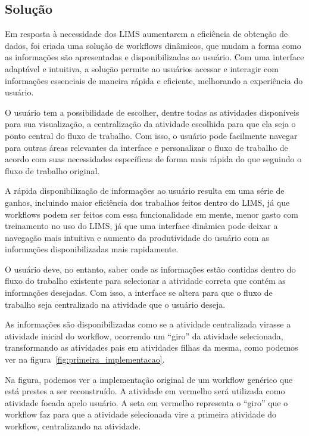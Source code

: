 \subsection{Solução}

Em resposta à necessidade dos LIMS aumentarem a eficiência de obtenção de dados, foi criada uma solução de workflows dinâmicos, que mudam a forma como as informações são apresentadas e disponibilizadas ao usuário.
Com uma interface adaptável e intuitiva, a solução permite ao usuários acessar e interagir com informações essenciais de maneira rápida e eficiente, melhorando a experiência do usuário.

O usuário tem a possibilidade de escolher, dentre todas as atividades disponíveis para sua visualização, a centralização da atividade escolhida para que ela seja o ponto central do fluxo de trabalho. Com isso, o usuário pode facilmente navegar para outras áreas relevantes da interface e personalizar o fluxo de trabalho de acordo com suas necessidades específicas de forma mais rápida do que seguindo o fluxo de trabalho original.

A rápida disponibilização de informações ao usuário resulta em uma série de ganhos, incluindo maior eficiência dos trabalhos feitos dentro do LIMS, já que workflows podem ser feitos com essa funcionalidade em mente, menor gasto com treinamento no uso do LIMS, já que uma interface dinâmica pode deixar a navegação mais intuitiva e aumento da produtividade do usuário com as informações disponibilizadas mais rapidamente.

O usuário deve, no entanto, saber onde as informações estão contidas dentro do fluxo do trabalho existente para selecionar a atividade correta que contém as informações desejadas. Com isso, a interface se altera para que o fluxo de trabalho seja centralizado na atividade que o usuário deseja.

As informações são disponibilizadas como se a atividade centralizada virasse a atividade inicial do workflow, ocorrendo um ``giro'' da atividade selecionada, transformando as atividades pais em atividades filhas da mesma, como podemos ver na figura~\ref{fig:primeira_implementacao}.

Na figura, podemos ver a implementação original de um workflow genérico que está prestes a ser reconstruído. A atividade em vermelho será utilizada como atividade focada apelo usuário. A seta em vermelho representa o ``giro'' que o workflow faz para que a atividade selecionada vire a primeira atividade do workflow, centralizando na atividade.


